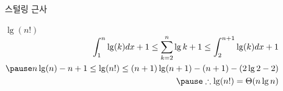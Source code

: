 \documentclass[10pt]{beamer}
\begin{document}
\begin{frame}{스털링 근사}

$\lg(n!)$
\pause
$
    \begin{aligned}
             \int_1^n \lg(k) dx +1 \le \sum_{k=2}^n \lg k + 1 \le \int_2^{n+1} \lg(k) dx +1\\ \pause
             n \lg(n) -n + 1 \le \lg(n!) \le (n+1)\lg(n+1) -(n+1) -(2\lg2 - 2) \\ \pause
            \therefore \lg(n!) = \Theta(n\lg n)
    \end{aligned}
$

\end{frame}
\end{document}
